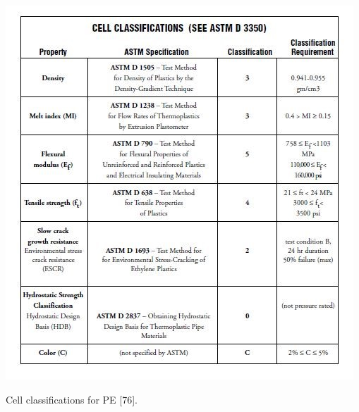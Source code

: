 \documentclass[12pt]{report}
\begin{document}
\begin{table}[H]
    \centering
    \includegraphics[width=\textwidth]{cell_classifications_for_pe.jpg}
    \caption{Cell classifications for PE [76].}
\end{table}
\end{document}
